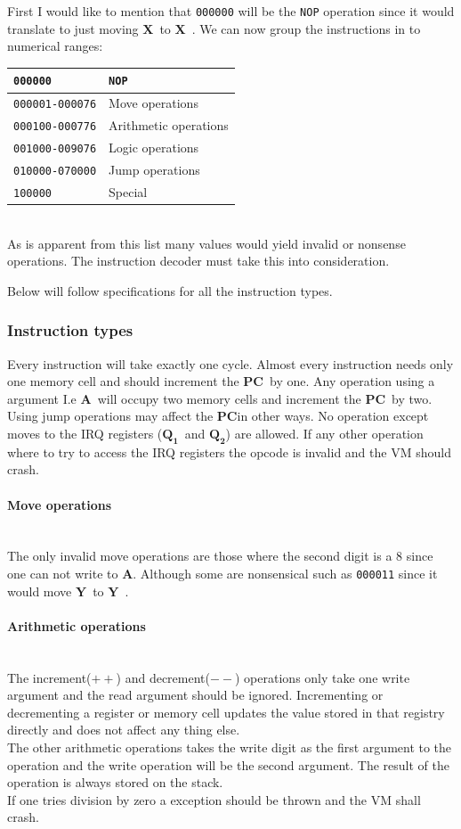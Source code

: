 \documentclass{article}
\newcommand{\V}{\verb}
\newcommand{\x}{$\textbf{X}$}
\newcommand{\y}{$\textbf{Y}$}
\newcommand{\A}{$\textbf{A}$}
\newcommand{\q}{$\textbf{Q}_{\textbf{1}}$}
\newcommand{\qq}{$\textbf{Q}_{\textbf{2}}$}
\newcommand{\pc}{$\textbf{PC}$}
\begin{document}
First I would like to  mention that
\verb+000000+ will be the \verb+NOP+ operation since it would translate to just
moving \x \ to \x \ .
We can now group the instructions in to numerical ranges:

\begin{tabular}{l l}
  \V+000000+ & \V+NOP+ \\
  \hline
  \V+000001-000076+ & Move operations \\
  \hline
  \V+000100-000776+ & Arithmetic operations \\
  \hline
  \V+001000-009076+ & Logic operations \\
  \hline
  \V+010000-070000+ & Jump operations \\
  \hline
  \V+100000+ & Special \\
\end{tabular} \\
As is apparent from this list many values would yield invalid or
nonsense operations.
The instruction decoder must take this into consideration.

Below will follow specifications for all the instruction types.

\subsubsection{Instruction types}
Every instruction will take exactly one cycle. Almost every instruction needs
only one memory cell and should increment the \pc \  by one.
Any operation using  a argument I.e \A \ will occupy two memory cells and
increment the \pc \ by two.\\
Using jump operations may affect the \pc in other ways.
No operation except moves to the IRQ registers (\q \ and \qq ) are allowed.
If any other operation where to try to access the IRQ registers the opcode is
invalid and the VM should crash.

\paragraph{Move operations}\
\\
The only invalid move operations are those where the second digit is a 8 since
one can not write to \A.
Although some are nonsensical such as \V+000011+ since it would move \y \ to \y \ .

\paragraph{Arithmetic operations} \
\\
The increment($++$) and decrement($--$) operations only take one write argument
and the read argument should be ignored. Incrementing or decrementing a register
or memory cell updates the value stored in that registry directly and does not
affect any thing else.\\
The other arithmetic operations takes the write digit as the first argument to
the operation and the write operation will be the second argument.
The result of the operation is always stored on the stack.\\
If one tries division by zero a exception should be thrown and the VM shall
crash.
\end{document}

